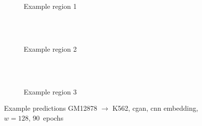 \begin{figure}[p] %
    \begin{subfigure}{\textwidth}
        \centering
        \caption{Example  region 1} \label{fig:results:cGAN128_r1}
    \end{subfigure}\\[2mm]
    \\[3mm]
    \begin{subfigure}{\textwidth}
        \centering
        \caption{Example region 2} \label{fig:results:cGAN128_r2}
    \end{subfigure}\\[2mm]
    \\[3mm]
    \begin{subfigure}{\textwidth}
        \centering
        \caption{Example region 3} \label{fig:results:cGAN128_r3}
    \end{subfigure}
    \caption{Example predictions GM12878 $\rightarrow$ K562, \acrshort{cgan}, \acrshort{cnn} embedding, $w=128$, 90~epochs} \label{fig:results:cGAN128_matrices}
\end{figure}

